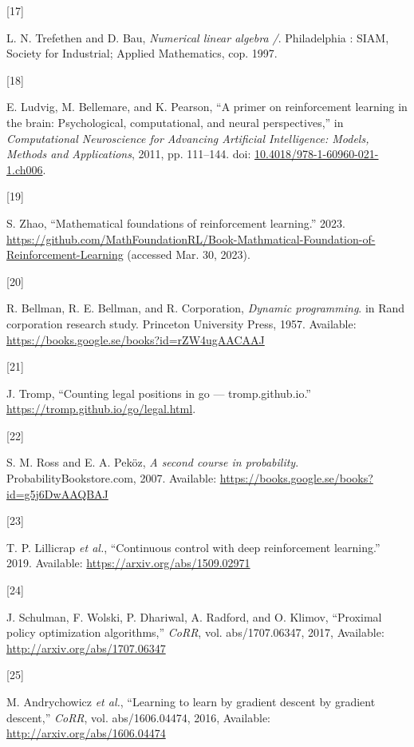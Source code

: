 \documentclass[
  letterpaper,
]{report}
\newlength{\cslhangindent}
\newlength{\csllabelwidth}
\newenvironment{CSLReferences}[2] %
 {\begin{list}{}{%
  \setlength{\itemindent}{0pt}
  \setlength{\leftmargin}{0pt}
  \setlength{\parsep}{0pt}
  \ifodd #1
   \setlength{\leftmargin}{\cslhangindent}
   \setlength{\itemindent}{-1\cslhangindent}
  \fi
  \setlength{\itemsep}{#2\baselineskip}}}
 {\end{list}}
\newcommand{\CSLLeftMargin}[1]{\parbox[t]{\csllabelwidth}{\strut#1\strut}}
\newcommand{\CSLRightInline}[1]{\parbox[t]{\linewidth - \csllabelwidth}{\strut#1\strut}}
\theoremstyle{definition}
\theoremstyle{plain}
\theoremstyle{definition}
\theoremstyle{remark}
\begin{document}
\begin{CSLReferences}{0}{0}
\CSLLeftMargin{{[}17{]} }%
\CSLRightInline{L. N. Trefethen and D. Bau, \emph{Numerical linear
algebra /}. Philadelphia : SIAM, Society for Industrial; Applied
Mathematics, cop. 1997.}

\CSLLeftMargin{{[}18{]} }%
\CSLRightInline{E. Ludvig, M. Bellemare, and K. Pearson, {``A primer on
reinforcement learning in the brain: Psychological, computational, and
neural perspectives,''} in \emph{Computational Neuroscience for
Advancing Artificial Intelligence: Models, Methods and Applications},
2011, pp. 111--144. doi:
\href{https://doi.org/10.4018/978-1-60960-021-1.ch006}{10.4018/978-1-60960-021-1.ch006}.}

\CSLLeftMargin{{[}19{]} }%
\CSLRightInline{S. Zhao, {``Mathematical foundations of reinforcement
learning.''} 2023.
\url{https://github.com/MathFoundationRL/Book-Mathmatical-Foundation-of-Reinforcement-Learning}
(accessed Mar. 30, 2023).}

\CSLLeftMargin{{[}20{]} }%
\CSLRightInline{R. Bellman, R. E. Bellman, and R. Corporation,
\emph{Dynamic programming}. in Rand corporation research study.
Princeton University Press, 1957. Available:
\url{https://books.google.se/books?id=rZW4ugAACAAJ}}

\CSLLeftMargin{{[}21{]} }%
\CSLRightInline{J. Tromp, {``Counting legal positions in go ---
tromp.github.io.''} \url{https://tromp.github.io/go/legal.html}.}

\CSLLeftMargin{{[}22{]} }%
\CSLRightInline{S. M. Ross and E. A. Peköz, \emph{A second course in
probability}. ProbabilityBookstore.com, 2007. Available:
\url{https://books.google.se/books?id=g5j6DwAAQBAJ}}

\CSLLeftMargin{{[}23{]} }%
\CSLRightInline{T. P. Lillicrap \emph{et al.}, {``Continuous control
with deep reinforcement learning.''} 2019. Available:
\url{https://arxiv.org/abs/1509.02971}}

\CSLLeftMargin{{[}24{]} }%
\CSLRightInline{J. Schulman, F. Wolski, P. Dhariwal, A. Radford, and O.
Klimov, {``Proximal policy optimization algorithms,''} \emph{CoRR}, vol.
abs/1707.06347, 2017, Available: \url{http://arxiv.org/abs/1707.06347}}

\CSLLeftMargin{{[}25{]} }%
\CSLRightInline{M. Andrychowicz \emph{et al.}, {``Learning to learn by
gradient descent by gradient descent,''} \emph{CoRR}, vol.
abs/1606.04474, 2016, Available: \url{http://arxiv.org/abs/1606.04474}}

\end{CSLReferences}
\end{document}
